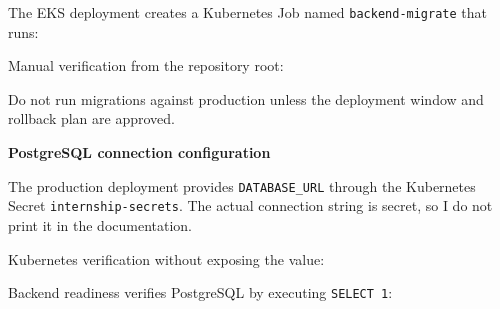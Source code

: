 The EKS deployment creates a Kubernetes Job named
\texttt{backend-\allowbreak{}migrate} that runs:

\begin{Shaded}
\begin{Highlighting}[]
\end{Highlighting}
\end{Shaded}

Manual verification from the repository root:

\begin{Shaded}
\begin{Highlighting}[]
\end{Highlighting}
\end{Shaded}

Do not run migrations against production unless the deployment window
and rollback plan are approved.

\vspace{0.5em}\noindent\textbf{PostgreSQL connection
configuration}\par

The production deployment provides \texttt{DATABASE\_\allowbreak{}URL} through the
Kubernetes Secret \texttt{internship-\allowbreak{}secrets}. The actual connection
string is secret, so I do not print it in the documentation.

Kubernetes verification without exposing the value:

\begin{Shaded}
\begin{Highlighting}[]
\end{Highlighting}
\end{Shaded}

Backend readiness verifies PostgreSQL by executing \texttt{SELECT\ 1}:

\begin{Shaded}
\begin{Highlighting}[]
 
\end{Highlighting}
\end{Shaded}


